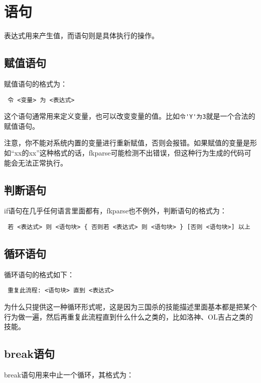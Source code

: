 \section{语句}

表达式用来产生值，而语句则是具体执行的操作。

\subsection{赋值语句}

赋值语句的格式为：

\begin{verbatim}
 令 <变量> 为 <表达式>
\end{verbatim}

这个语句通常用来定义变量，也可以改变变量的值。比如\verb|令'Y'为3|就是一个合法的赋值语句。

注意，你不能对系统内置的变量进行重新赋值，否则会报错。如果赋值的变量是形如“xx的xx”这种格式的话，fkparse可能检测不出错误，但这种行为生成的代码可能会无法正常执行。

\subsection{判断语句}

if语句在几乎任何语言里面都有，fkparse也不例外，判断语句的格式为：

\begin{verbatim}
 若 <表达式> 则 <语句块> { 否则若 <表达式> 则 <语句块> } [否则 <语句块>] 以上
\end{verbatim}

\subsection{循环语句}

循环语句的格式如下：

\begin{verbatim}
 重复此流程: <语句块> 直到 <表达式>
\end{verbatim}

为什么只提供这一种循环形式呢，这是因为三国杀的技能描述里面基本都是把某个行为做一遍，然后再重复此流程直到什么什么之类的，比如洛神、OL吉占之类的技能。

\subsection{break语句}

break语句用来中止一个循环，其格式为：

